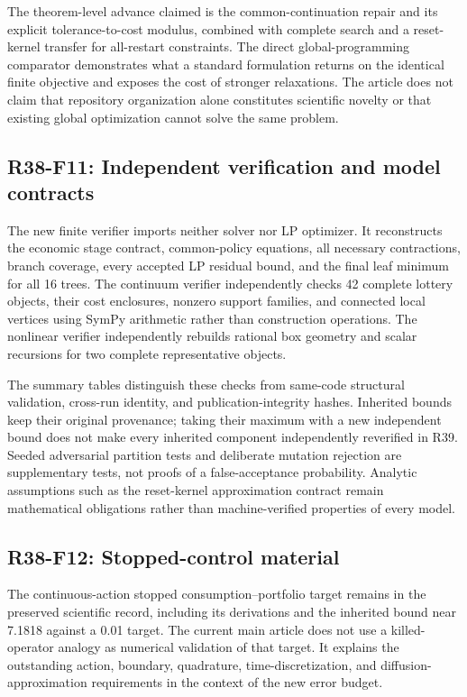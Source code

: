 The theorem-level advance claimed is the common-continuation repair and its explicit tolerance-to-cost modulus, combined with complete search and a reset-kernel transfer for all-restart constraints. The direct global-programming comparator demonstrates what a standard formulation returns on the identical finite objective and exposes the cost of stronger relaxations. The article does not claim that repository organization alone constitutes scientific novelty or that existing global optimization cannot solve the same problem.

\subsection{R38-F11: Independent verification and model contracts}
The new finite verifier imports neither solver nor LP optimizer. It reconstructs the economic stage contract, common-policy equations, all necessary contractions, branch coverage, every accepted LP residual bound, and the final leaf minimum for all 16 trees. The continuum verifier independently checks 42 complete lottery objects, their cost enclosures, nonzero support families, and connected local vertices using SymPy arithmetic rather than construction operations. The nonlinear verifier independently rebuilds rational box geometry and scalar recursions for two complete representative objects.

The summary tables distinguish these checks from same-code structural validation, cross-run identity, and publication-integrity hashes. Inherited bounds keep their original provenance; taking their maximum with a new independent bound does not make every inherited component independently reverified in R39. Seeded adversarial partition tests and deliberate mutation rejection are supplementary tests, not proofs of a false-acceptance probability. Analytic assumptions such as the reset-kernel approximation contract remain mathematical obligations rather than machine-verified properties of every model.

\subsection{R38-F12: Stopped-control material}
The continuous-action stopped consumption--portfolio target remains in the preserved scientific record, including its derivations and the inherited bound near 7.1818 against a 0.01 target. The current main article does not use a killed-operator analogy as numerical validation of that target. It explains the outstanding action, boundary, quadrature, time-discretization, and diffusion-approximation requirements in the context of the new error budget.

